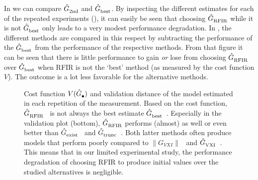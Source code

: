 
\newcommand{\reviewer}[1]{\paragraph{#1}}

In  we can compare $\hat{G}_{\mathrm{2nd}}^{\mathrm{}}$ and $\hat{G}_{\mathrm{best}}^{\mathrm{}}$.
By inspecting the different estimates for  each of the repeated experiments (), it can easily be seen that choosing $\hat{G}_{\mathrm{RFIR}}^{\mathrm{}}$ while it is not $\hat{G}_{\mathrm{best}}^{\mathrm{}}$ only leads to a very modest performance degradation.
In , the different methods are compared in this respect by subtracting the performance of the $\hat{G}_{\mathrm{best}}^{\mathrm{}}$ from the performance of the respective methods.
From that figure it can be seen that there is little performance to gain \emph{or} lose from choosing $\hat{G}_{\mathrm{RFIR}}^{\mathrm{}}$ over $\hat{G}_{\mathrm{best}}^{\mathrm{}}$ when RFIR is not the `best' method (as measured by the cost function $V$).
The outcome is a lot less favorable for the alternative methods.

\begin{figure}
  \centering
  \setlength{\figurewidth}{0.85\columnwidth}
  \setlength{\figureheight}{0.68\figurewidth}
  
  \caption[$\costFunc{\bullet}$ and $\validationDistance{\bullet}$ for each repeated measurement.]{Cost function $V(\hat{G}_{\mathrm{\bullet}}^{\mathrm{}})$ and validation distance of the model estimated in each repetition of the measurement.
  Based on the cost function, $\hat{G}_{\mathrm{RFIR}}^{\mathrm{}}$~ is not always the best estimate $\hat{G}_{\mathrm{best}}^{\mathrm{}}$~.
  Especially in the validation plot (bottom), $\hat{G}_{\mathrm{RFIR}}^{\mathrm{}}$ performs (almost) as well or even better than $\hat{G}_{\mathrm{exist}}^{\mathrm{}}$~ and $\hat{G}_{\mathrm{trunc}}^{\mathrm{}}$~.
  Both latter methods often produce models that perform poorly compared to $\| G_{VXI} \|$~ and $\hat{G}_{\mathrm{VXI}}^{\mathrm{}}$~.
  This means that in our limited experimental study, the performance degradation of choosing RFIR to produce initial values over the studied alternatives is negligible.}
  \label{fig:overview}
\end{figure}


